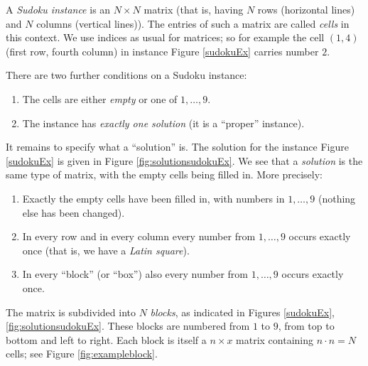 \documentclass[11pt]{report}
\begin{document}
A \textit{Sudoku instance} is an $N \times N$ matrix (that is, having $N$ rows (horizontal lines) and $N$ columns (vertical lines)). The entries of such a matrix are called \textit{cells} in this context. We use indices as usual for matrices; so for example the cell $(1,4)$ (first row, fourth column) in instance Figure \ref{sudokuEx} carries number $2$.

There are two further conditions on a Sudoku instance:
\begin{enumerate}
\item The cells are either \emph{empty} or one of $1, \dots, 9$.
\item The instance has \emph{exactly one solution} (it is a ``proper'' instance).
\end{enumerate}

It remains to specify what a ``solution'' is. The solution for the instance Figure \ref{sudokuEx} is given in Figure \ref{fig:solutionsudokuEx}. We see that a \textit{solution} is the same type of matrix, with the empty cells being filled in. More precisely:
\begin{enumerate}
\item Exactly the empty cells have been filled in, with numbers in $1,\dots,9$ (nothing else has been changed).
\item In every row and in every column every number from $1,\dots,9$ occurs exactly once (that is, we have a \emph{Latin square}).
\item In every ``block'' (or ``box'') also every number from $1,\dots,9$ occurs exactly once.
\end{enumerate}

The matrix is subdivided into $N$ \textit{blocks}, as indicated in Figures \ref{sudokuEx}, \ref{fig:solutionsudokuEx}. These blocks are numbered from $1$ to $9$, from top to bottom and left to right. Each block is itself a $n \times x$ matrix containing $n \cdot n = N$ cells; see Figure \ref{fig:exampleblock}.
\end{document}
